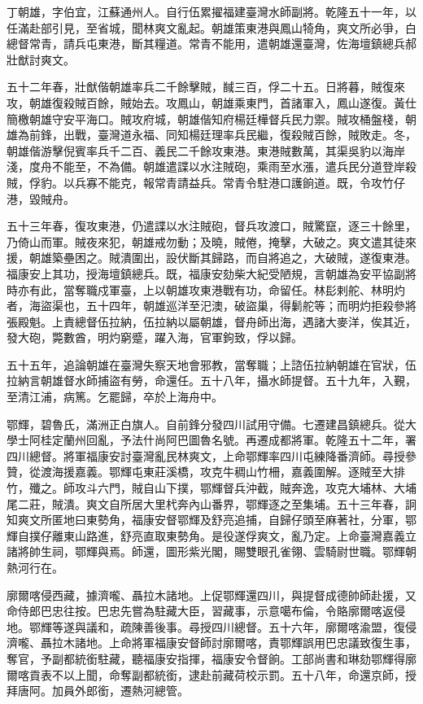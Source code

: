 \begin{pinyinscope}
丁朝雄，字伯宜，江蘇通州人。自行伍累擢福建臺灣水師副將。乾隆五十一年，以任滿赴部引見，至省城，聞林爽文亂起。朝雄策東港與鳳山犄角，爽文所必爭，白總督常青，請兵屯東港，斷其糧道。常青不能用，遣朝雄還臺灣，佐海壇鎮總兵郝壯猷討爽文。

五十二年春，壯猷偕朝雄率兵二千餘擊賊，馘三百，俘二十五。日將暮，賊復來攻，朝雄復殺賊百餘，賊始去。攻鳳山，朝雄乘東門，首諸軍入，鳳山遂復。黃仕簡檄朝雄守安平海口。賊攻府城，朝雄偕知府楊廷樺督兵民力禦。賊攻桶盤棧，朝雄為前鋒，出戰，臺灣道永福、同知楊廷理率兵民繼，復殺賊百餘，賊敗走。冬，朝雄偕游擊倪賓率兵千二百、義民二千餘攻東港。東港賊數萬，其渠吳豹以海岸淺，度舟不能至，不為備。朝雄遣諜以水注賊砲，乘雨至水漲，遣兵民分道登岸殺賊，俘豹。以兵寡不能克，報常青請益兵。常青令駐港口護餉道。既，令攻竹仔港，毀賊舟。

五十三年春，復攻東港，仍遣諜以水注賊砲，督兵攻渡口，賊驚竄，逐三十餘里，乃倚山而軍。賊夜來犯，朝雄戒勿動；及曉，賊倦，掩擊，大破之。爽文遣其徒來援，朝雄築壘困之。賊潰圍出，設伏斷其歸路，而自將追之，大破賊，遂復東港。福康安上其功，授海壇鎮總兵。既，福康安劾柴大紀受陋規，言朝雄為安平協副將時亦有此，當奪職戍軍臺，上以朝雄攻東港戰有功，命留任。林髟剌舵、林明灼者，海盜渠也，五十四年，朝雄巡洋至汜澳，破盜巢，得鬎舵等；而明灼拒殺參將張殿魁。上責總督伍拉納，伍拉納以屬朝雄，督舟師出海，遇諸大麥洋，俟其近，發大砲，斃數酋，明灼窮蹙，躍入海，官軍鉤致，俘以歸。

五十五年，追論朝雄在臺灣失察天地會邪教，當奪職；上諮伍拉納朝雄在官狀，伍拉納言朝雄督水師捕盜有勞，命還任。五十八年，攝水師提督。五十九年，入覲，至清江浦，病篤。乞罷歸，卒於上海舟中。

鄂輝，碧魯氏，滿洲正白旗人。自前鋒分發四川試用守備。七遷建昌鎮總兵。從大學士阿桂定蘭州回亂，予法什尚阿巴圖魯名號。再遷成都將軍。乾隆五十二年，署四川總督。將軍福康安討臺灣亂民林爽文，上命鄂輝率四川屯練降番濟師。尋授參贊，從渡海援嘉義。鄂輝屯東莊溪橋，攻克牛稠山竹柵，嘉義圍解。逐賊至大排竹，殲之。師攻斗六門，賊自山下撲，鄂輝督兵沖截，賊奔逸，攻克大埔林、大埔尾二莊，賊潰。爽文自所居大里杙奔內山番界，鄂輝逐之至集埔。五十三年春，詗知爽文所匿地曰東勢角，福康安督鄂輝及舒亮追捕，自歸仔頭至麻著社，分軍，鄂輝自撲仔離東山路進，舒亮直取東勢角。是役遂俘爽文，亂乃定。上命臺灣嘉義立諸將帥生祠，鄂輝與焉。師還，圖形紫光閣，賜雙眼孔雀翎、雲騎尉世職。鄂輝朝熱河行在。

廓爾喀侵西藏，據濟嚨、聶拉木諸地。上促鄂輝還四川，與提督成德帥師赴援，又命侍郎巴忠往按。巴忠先嘗為駐藏大臣，習藏事，示意噶布倫，令賂廓爾喀返侵地。鄂輝等遂與議和，疏陳善後事。尋授四川總督。五十六年，廓爾喀渝盟，復侵濟嚨、聶拉木諸地。上命將軍福康安督師討廓爾喀，責鄂輝誤用巴忠議致復生事，奪官，予副都統銜駐藏，聽福康安指揮，福康安令督餉。工部尚書和琳劾鄂輝得廓爾喀貢表不以上聞，命奪副都統銜，逮赴前藏荷校示罰。五十八年，命還京師，授拜唐阿。加員外郎銜，遷熱河總管。


\end{pinyinscope}
